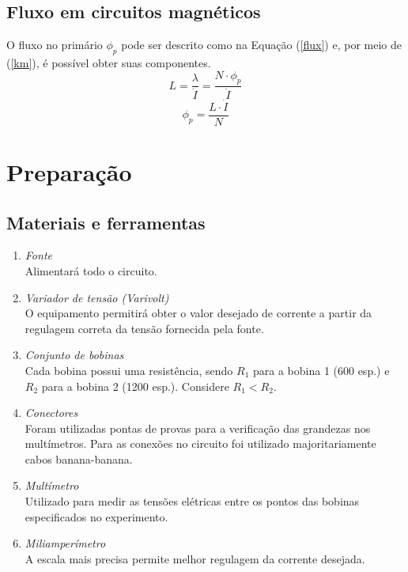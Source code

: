\documentclass[a4paper,12pt,oneside,openany,table,xcdraw]{article}
\begin{document}
\subsection{Fluxo em circuitos magnéticos}
O fluxo no primário $\phi_p$ pode ser descrito como na Equação (\ref{flux}) e, por meio de (\ref{km}), é possível obter suas componentes.
\begin{equation*}
L= \dfrac{\lambda}{\dot{I}}=\dfrac{N\cdot \phi_p}{\dot{I}}
\end{equation*}
\begin{equation}\label{flux}
\phi_p=\dfrac{L\cdot\dot{I}}{N}
\end{equation}


\section{Preparação}
\subsection{Materiais e ferramentas} %
\begin{enumerate}[1 - ]
\item \emph{Fonte}\\
Alimentará todo o circuito.

\item \emph{Variador de tensão (Varivolt)}\\
O equipamento permitirá obter o valor desejado de corrente a partir da regulagem correta da tensão fornecida pela fonte.

\item \emph{Conjunto de bobinas}\\
Cada bobina possui uma resistência, sendo $R_1$ para a bobina 1 (600 esp.) e $R_2$ para a bobina 2 (1200 esp.). Considere $R_1<R_2$.

\item \emph{Conectores}\\
Foram utilizadas pontas de provas para a verificação das grandezas nos multímetros. Para as conexões no circuito foi utilizado majoritariamente cabos banana-banana.

\item \emph{Multímetro}\\
Utilizado para medir as tensões elétricas entre os pontos das bobinas especificados no experimento.

\item \emph{Miliamperímetro}\\
A escala mais precisa permite melhor regulagem da corrente desejada.

\end{enumerate}
\end{document}
